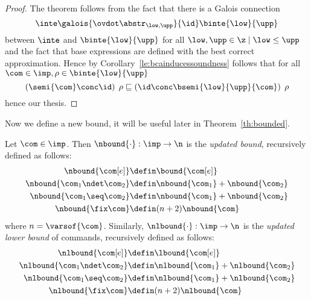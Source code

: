 \begin{proof}
  The theorem follows from the fact that there is a Galois connection
  \begin{equation*}
    \inte\galois{\ovdot\abstr_{\low, \upp}}{\id}\binte{\low}{\upp}
  \end{equation*}
  between \(\inte\) and \(\binte{\low}{\upp}\) for all
  \(\low, \upp \in \z \mid \low \leq \upp\) and the fact that base
  expressions are defined with the best correct approximation. Hence by
  Corollary~\ref{le:bcainducessoundness} follows that for all
  \(\com\in\imp, \rho \in \binte{\low}{\upp}\)
  \begin{equation*}
    \left(\semi{\com} \conc \id \right)\;\rho \sqsubseteq  \left(\id \conc \bsemi{\low}{\upp}{\com}\right)\;\rho
  \end{equation*}
  hence our thesis.
\end{proof}

Now we define a new bound, it will be useful later in
Theorem~\ref{th:bounded}.

\begin{definition}\label{def:newbound}
  Let \(\com\in\imp\). Then \(\nbound{\cdot} : \imp \to \n\) is the
  \emph{updated bound}, recursively defined as follows:
  \begin{align*}
    \nbound{\com[e]} & \defin \bound{\com[e]} \\
    \nbound{\com_1 \ndet \com_2} & \defin \nbound{\com_1} + \nbound{\com_2} \\
    \nbound{\com_1 \seq \com_2} & \defin \nbound{\com_1} + \nbound{\com_2} \\
    \nbound{\fix\com} & \defin (n+2)\nbound{\com} \\
  \end{align*}
  where \(n = \varsof{\com}\). Similarly,
  \(\nlbound{\cdot} : \imp \to \n\) is the \emph{updated lower bound}
  of commands, recursively defined as follows:
  \begin{align*}
    \nlbound{\com[e]} & \defin \lbound{\com[e]} \\
    \nlbound{\com_1 \ndet \com_2} & \defin \nlbound{\com_1} + \nlbound{\com_2} \\
    \nlbound{\com_1 \seq \com_2} & \defin \nlbound{\com_1} + \nlbound{\com_2} \\
    \nlbound{\fix\com} & \defin (n+2)\nlbound{\com} \\
  \end{align*}
\end{definition}

